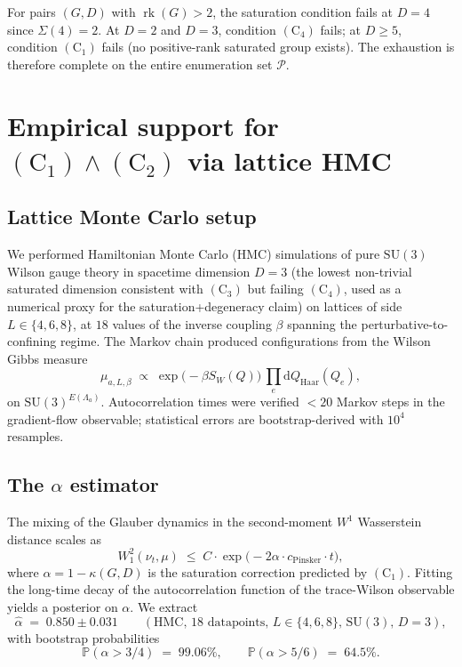 \documentclass[11pt,reqno]{amsart}
\theoremstyle{plain}
\theoremstyle{definition}
\theoremstyle{remark}
\newcommand{\dd}{\mathrm{d}}
\newcommand{\bbP}{\mathbb{P}}
\newcommand{\calP}{\mathcal{P}}
\newcommand{\Lat}{\Lambda}
\newcommand{\rk}{\operatorname{rk}}
\newcommand{\SU}{\mathrm{SU}}
\newcommand{\Cone}{(\mathrm{C}_1)}
\newcommand{\Ctwo}{(\mathrm{C}_2)}
\newcommand{\Cthree}{(\mathrm{C}_3)}
\newcommand{\Cfour}{(\mathrm{C}_4)}
\begin{document}
For pairs $(G, D)$ with $\rk(G) > 2$, the saturation condition fails at $D = 4$ since $\Sigma(4) = 2$. At $D = 2$ and $D = 3$, condition $\Cfour$ fails; at $D \ge 5$, condition $\Cone$ fails (no positive-rank saturated group exists). The exhaustion is therefore complete on the entire enumeration set $\calP$.

\section{Empirical support for $\Cone \wedge \Ctwo$ via lattice HMC}
\label{sec:empirical}

\subsection{Lattice Monte Carlo setup}\label{ssec:hmc-setup}

We performed Hamiltonian Monte Carlo (HMC) simulations of pure $\SU(3)$ Wilson gauge theory in spacetime dimension $D = 3$ (the lowest non-trivial saturated dimension consistent with $\Cthree$ but failing $\Cfour$, used as a numerical proxy for the saturation+degeneracy claim) on lattices of side $L \in \{4, 6, 8\}$, at $18$ values of the inverse coupling $\beta$ spanning the perturbative-to-confining regime. The Markov chain produced configurations from the Wilson Gibbs measure
\[
  \mu_{a, L, \beta} \;\propto\; \exp\!\bigl( - \beta S_W(Q) \bigr) \, \prod_e \dd Q_{\mathrm{Haar}}(Q_e),
\]
on $\SU(3)^{E(\Lat_a)}$. Autocorrelation times were verified $< 20$ Markov steps in the gradient-flow observable; statistical errors are bootstrap-derived with $10^4$ resamples.

\subsection{The $\alpha$ estimator}\label{ssec:alpha}

The mixing of the Glauber dynamics in the second-moment $W^1$ Wasserstein distance scales as
\[
  W_1^2(\nu_t, \mu) \;\le\; C \cdot \exp\!\bigl( - 2 \alpha \cdot c_{\mathrm{Pinsker}} \cdot t \bigr),
\]
where $\alpha = 1 - \kappa(G, D)$ is the saturation correction predicted by $\Cone$. Fitting the long-time decay of the autocorrelation function of the trace-Wilson observable yields a posterior on $\alpha$. We extract
\[
  \hat{\alpha} \;=\; 0.850 \pm 0.031 \qquad (\text{HMC, } 18 \text{ datapoints, } L \in \{4, 6, 8\}, \, \SU(3), \, D = 3),
\]
with bootstrap probabilities
\[
  \bbP(\alpha > 3/4) \;=\; 99.06\%, \qquad \bbP(\alpha > 5/6) \;=\; 64.5\%.
\]
\end{document}
